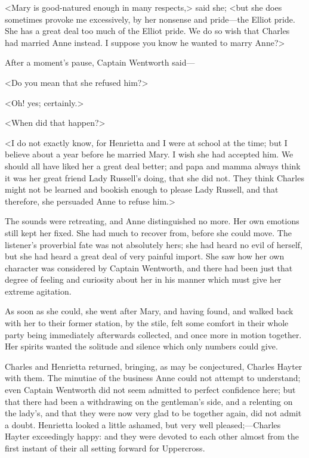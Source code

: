 <Mary is good-natured enough in many respects,> said she; <but she does sometimes provoke me excessively, by her nonsense and pride—the Elliot pride. She has a great deal too much of the Elliot pride. We do so wish that Charles had married Anne instead. I suppose you know he wanted to marry Anne?>

After a moment's pause, Captain Wentworth said—

<Do you mean that she refused him?>

<Oh! yes; certainly.>

<When did that happen?>

<I do not exactly know, for Henrietta and I were at school at the time; but I believe about a year before he married Mary. I wish she had accepted him. We should all have liked her a great deal better; and papa and mamma always think it was her great friend Lady Russell's doing, that she did not. They think Charles might not be learned and bookish enough to please Lady Russell, and that therefore, she persuaded Anne to refuse him.>

The sounds were retreating, and Anne distinguished no more. Her own emotions still kept her fixed. She had much to recover from, before she could move. The listener's proverbial fate was not absolutely hers; she had heard no evil of herself, but she had heard a great deal of very painful import. She saw how her own character was considered by Captain Wentworth, and there had been just that degree of feeling and curiosity about her in his manner which must give her extreme agitation.

As soon as she could, she went after Mary, and having found, and walked back with her to their former station, by the stile, felt some comfort in their whole party being immediately afterwards collected, and once more in motion together. Her spirits wanted the solitude and silence which only numbers could give.

Charles and Henrietta returned, bringing, as may be conjectured, Charles Hayter with them. The minutiae of the business Anne could not attempt to understand; even Captain Wentworth did not seem admitted to perfect confidence here; but that there had been a withdrawing on the gentleman's side, and a relenting on the lady's, and that they were now very glad to be together again, did not admit a doubt. Henrietta looked a little ashamed, but very well pleased;—Charles Hayter exceedingly happy: and they were devoted to each other almost from the first instant of their all setting forward for Uppercross.

